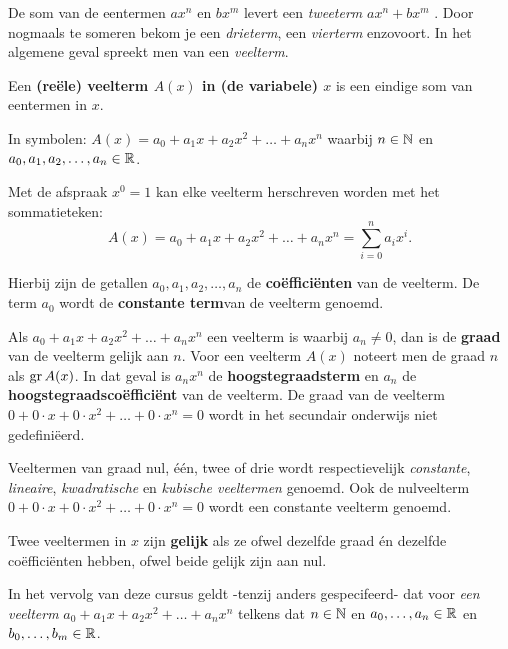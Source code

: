 \documentclass{ximera}
\begin{document}
\author{Koen de Naeghel - Wiskunde Op Maat}
    \xmsource



De som van de eentermen  $ax^n$ en $bx^m$ levert een \textit{tweeterm} $ax^n + bx^m$ . Door nogmaals te someren bekom je een \textit{ drieterm}, een \textit{ vierterm} enzovoort. In het algemene geval spreekt men van een \textit{ veelterm}.

\begin{definition} 
Een \textbf{(reële) veelterm \(A(x)\) in (de variabele) $x$} is een eindige som van eentermen in $x$.

In symbolen: $A(x) = a_0 + a_1x + a_2x^2 + \dots + a_n x^n$ waarbij $n \in \mathbb{N}$ en $a_0,a_1,a_2,\ldots,a_n \in \mathbb{R}$.


Met de afspraak $x^0 = 1$ kan elke veelterm herschreven worden met het sommatieteken:
\[
A(x) = a_0 + a_1x + a_2x^2 + \dots + a_n x^n = \sum_{i=0}^n a_i x^i.
\]

Hierbij zijn de getallen $a_0, a_1, a_2, \ldots, a_n$ de \textbf{coëfficiënten} van de veelterm. De term $a_0$ wordt de \textbf{constante term}van de veelterm genoemd.


Als $a_0 + a_1x + a_2x^2 + \dots + a_n x^n$ een veelterm is waarbij $a_n \neq 0$, dan is de \textbf{graad} van de veelterm gelijk aan $n$. Voor een veelterm $A(x)$ noteert men de graad \(n\) als $\operatorname{gr} A(x)$. In dat geval is $a_nx^n$ de \textbf{hoogstegraadsterm} en $a_n$ de \textbf{hoogstegraadscoëfficiënt} van de veelterm. De graad van de veelterm $0 + 0\cdot x + 0 \cdot x^2 + \dots + 0\cdot x^n = 0$ wordt in het secundair onderwijs niet gedefiniëerd.

Veeltermen van graad nul, één, twee of drie wordt respectievelijk \textit{constante}, \textit{lineaire}, \linebreak \textit{kwadratische} en \textit{kubische veeltermen} genoemd. Ook de nulveelterm $0 + 0\cdot x + 0 \cdot x^2 + \dots + 0\cdot x^n = 0$ wordt een constante veelterm genoemd.


Twee veeltermen in $x$ zijn \textbf{gelijk} als ze ofwel dezelfde graad én dezelfde coëfficiënten hebben, ofwel beide gelijk zijn aan nul. 


\end{definition}




\begin{notation}
    
    In het vervolg van deze cursus geldt -tenzij anders gespecifeerd- dat voor \textit{ een veelterm} $a_0 + a_1x + a_2x^2 + \dots + a_n x^n$ telkens dat $n \in \mathbb{N}$ en $a_0, \ldots, a_n\in \mathbb{R}$ en $b_0, \ldots, b_m\in \mathbb{R}$.
    
\end{notation}
\end{document}
